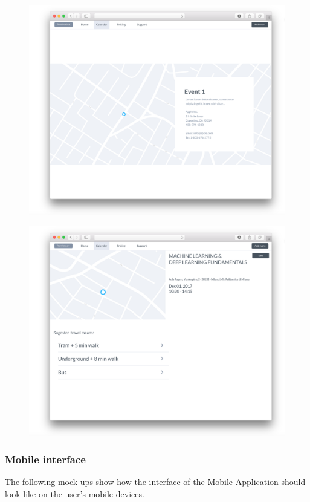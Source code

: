 \documentclass{article}
\begin{document}
	\begin{figure}[!ht]
	\centering
	\includegraphics[height=0.4\textheight]{img/mockups/web/map.png}
	\caption{}
	\end{figure}
	\clearpage

	\begin{figure}[!ht]
	\centering
	\includegraphics[height=0.5\textheight]{img/mockups/web/event.png}
	\caption{}
	\end{figure}
	

	\subsubsection{Mobile interface}
	The following mock-ups show how the interface of the Mobile Application should look like on the user’s mobile devices.
\end{document}
